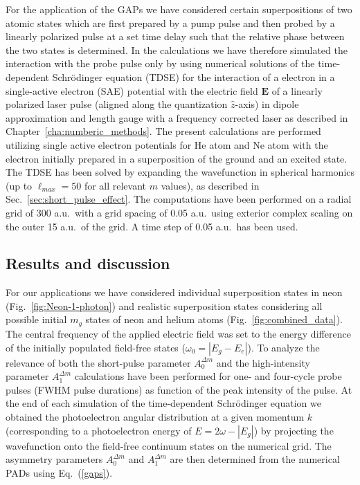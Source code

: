 For the application of the GAPs we have considered certain superpositions of two atomic states which are first prepared by a pump pulse and then probed by a linearly polarized pulse at a set time delay such that the relative phase between the two states is determined. In the calculations we have therefore simulated the interaction with the probe pulse only by
using numerical solutions of the time-dependent Schr\"odinger equation (TDSE) for the interaction of a electron in a single-active electron (SAE) potential with the electric field $\mathbf{E}$ of a linearly polarized laser pulse (aligned along the quantization ${\hat z}$-axis) in dipole approximation and length gauge with a frequency corrected laser as described in Chapter~\ref{cha:numberic_methods}. The present calculations are performed utilizing single active electron potentials for He atom and Ne atom \cite{reiff2020} with the electron initially prepared in a superposition of the ground and an excited state. The TDSE has been solved by expanding the wavefunction in spherical harmonics (up to $\ell_{max} = 50$ for all relevant $m$ values), as described in Sec.~\ref{sec:short_pulse_effect}. The computations have been performed on a radial grid of 300 a.u.\ with a grid spacing of 0.05 a.u.\, using exterior complex scaling on the outer 15 a.u.\ of the grid. A time step of 0.05 a.u.\ has been used.

\subsection{Results and discussion}

For our applications we have considered individual superposition states in neon (Fig.~\ref{fig:Neon-1-photon}) and realistic superposition states considering all possible initial $m_g$ states of neon and helium atoms (Fig.~\ref{fig:combined_data}). The central frequency of the applied electric field was set to the energy difference of the initially populated field-free states ($\omega_0=|E_g-E_e|$). To analyze the relevance of both the short-pulse parameter $A_0^{\Delta m}$ and the high-intensity parameter $A_1^{\Delta m}$ calculations have been performed for one- and four-cycle probe pulses (FWHM pulse durations) as function of the peak intensity of the pulse. At the end of each simulation of the time-dependent Schr\"odinger equation we obtained the photoelectron angular distribution at a given momentum $k$ (corresponding to a photoelectron energy of $E=2\omega-|E_g|$) by projecting the wavefunction onto the field-free continuum states on the numerical grid. The asymmetry parameters $A_0^{\Delta m}$ and $A_1^{\Delta m}$ are then determined from the numerical PADs using Eq.~(\ref{gaps}).

